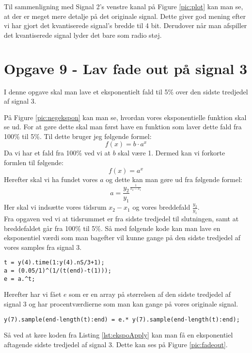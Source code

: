 \documentclass[../main.tex]{subfiles}
\begin{document}
Til sammenligning med Signal 2's venstre kanal på Figure \ref{pic:plot} kan man se, at der er meget mere detalje på det originale signal.
Dette giver god mening efter vi har gjort det kvantiserede signal's bredde til 4 bit.
Derudover når man afspiller det kvantiserede signal lyder det bare som radio støj.


\section{Opgave 9 - Lav fade out på signal 3}
I denne opgave skal man lave et eksponentielt fald til 5\% over den sidste tredjedel af signal 3.

På Figure \ref{pic:negekspon} kan man se, hvordan vores eksponentielle funktion skal se ud.
For at gøre dette skal man først have en funktion som laver dette fald fra 100\% til 5\%. Til dette bruger jeg følgende formel:
\[
    f(x) = b \cdot a^x
\]
Da vi har et fald fra 100\% ved vi at $b$ skal være 1. Dermed kan vi forkorte formlen til følgende:
\[
    f(x) = a^x
\]
Herefter skal vi ha fundet vores $a$ og dette kan man gøre ud fra følgende formel:
\[
    a = \frac{y_2}{y_1}^{\frac{1}{x_2-x_1}}
\]
Her skal vi indsætte vores tidsrum $x_2-x_1$ og vores breddefald $\frac{y_2}{y_1}$.\\
Fra opgaven ved vi at tidsrummet er fra sidste tredjedel til slutningen, samt at breddefaldet går fra 100\% til 5\%.
Så med følgende kode kan man lave en eksponentiel værdi som man bagefter vil kunne gange på den sidste tredjedel af vores samples fra signal 3.
\begin{lstlisting}[caption={Oprettelse af eksponentielt aftagende funktion}, label={lst:ekspo}]
t = y(4).time(1:y(4).nS/3+1);
a = (0.05/1)^(1/(t(end)-t(1)));
e = a.^t; 
\end{lstlisting}
Herefter har vi fået $e$ som er en array på størrelsen af den sidste tredjedel af signal 3 og har procentværdierne som man kan gange på vores originale signal.
\begin{lstlisting}[caption={Oprettelse af eksponentielt aftagende funktion}, label={lst:ekspoApply}]
y(7).sample(end-length(t):end) = e.* y(7).sample(end-length(t):end);
\end{lstlisting}
Så ved at køre koden fra Listing \ref{lst:ekspoApply} kan man få en eksponentiel aftagende sidste tredjedel af signal 3.
Dette kan ses på Figure \ref{pic:fadeout}.
\end{document}
